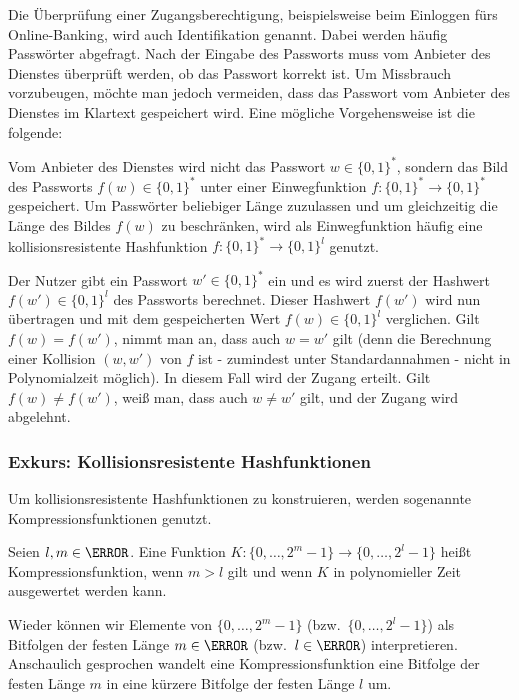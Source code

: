 \begin{remark}[Identifikation]
 Die Überprüfung einer Zugangsberechtigung, beispielsweise beim Einloggen fürs Online-Banking, wird auch Identifikation genannt. Dabei werden häufig Passwörter abgefragt. Nach der Eingabe des Passworts muss vom Anbieter des Dienstes überprüft werden, ob das Passwort korrekt ist. Um Missbrauch vorzubeugen, möchte man jedoch vermeiden, dass das Passwort vom Anbieter des Dienstes im Klartext gespeichert wird. Eine mögliche Vorgehensweise ist die folgende:
 
 Vom Anbieter des Dienstes wird nicht das Passwort $w \in \{0, 1\}^*$, sondern das Bild des Passworts $f(w) \in \{0, 1\}^*$ unter einer Einwegfunktion $f: \{0, 1\}^* → \{0, 1\}^*$ gespeichert. Um Passwörter beliebiger Länge zuzulassen und um gleichzeitig die Länge des Bildes $f(w)$ zu beschränken, wird als Einwegfunktion häufig eine kollisionsresistente Hashfunktion $f: \{0, 1\}^* → \{0, 1\}^l$ genutzt. 
 
 Der Nutzer gibt ein Passwort $w' \in \{0, 1\}^*$ ein und es wird zuerst der Hashwert $f(w') \in \{0, 1\}^l$ des Passworts berechnet. Dieser Hashwert $f(w')$ wird nun übertragen und mit dem gespeicherten Wert $f(w) \in \{0, 1\}^l$ verglichen. Gilt $f(w) = f(w')$, nimmt man an, dass auch $w = w'$ gilt (denn die Berechnung einer Kollision $(w, w')$ von $f$ ist - zumindest unter Standardannahmen - nicht in Polynomialzeit möglich). In diesem Fall wird der Zugang erteilt. Gilt $f(w) ≠ f(w')$, weiß man, dass auch $w ≠ w'$ gilt, und der Zugang wird abgelehnt.
\end{remark}

\subsubsection{Exkurs: Kollisionsresistente Hashfunktionen}


Um kollisionsresistente Hashfunktionen zu konstruieren, werden sogenannte Kompressionsfunktionen genutzt.

\begin{definition}
 Seien $l, m \in \N$. Eine Funktion $K: \{0, \dotsc, 2^m-1\} → \{0, \dotsc, 2^l-1\}$ heißt Kompressionsfunktion, wenn $m > l$ gilt und wenn $K$ in polynomieller Zeit ausgewertet werden kann.
\end{definition}

Wieder können wir Elemente von $\{0, \dotsc, 2^m-1\}$ (bzw.~$\{0, \dotsc, 2^l-1\}$) als Bitfolgen der festen Länge $m \in \N$ (bzw.~$l \in \N$) interpretieren. Anschaulich gesprochen wandelt eine Kompressionsfunktion eine Bitfolge der festen Länge $m$ in eine kürzere Bitfolge der festen Länge $l$ um.

